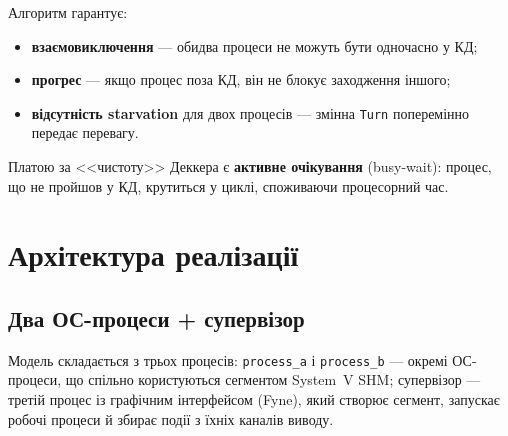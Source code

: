 \documentclass[a4paper,12pt]{article}
\begin{document}
Алгоритм гарантує:
\begin{itemize}
    \item \textbf{взаємовиключення} --- обидва процеси не можуть бути
    одночасно у КД;
    \item \textbf{прогрес} --- якщо процес поза КД, він не блокує
    заходження іншого;
    \item \textbf{відсутність starvation} для двох процесів --- змінна
    \texttt{Turn} поперемінно передає перевагу.
\end{itemize}

Платою за <<чистоту>> Деккера є \textbf{активне очікування} (busy-wait):
процес, що не пройшов у КД, крутиться у циклі, споживаючи процесорний
час.

\section{Архітектура реалізації}

\subsection{Два ОС-процеси + супервізор}

Модель складається з трьох процесів: \texttt{process\_a} і
\texttt{process\_b} --- окремі ОС-процеси, що спільно користуються
сегментом System~V SHM; супервізор --- третій процес із графічним
інтерфейсом (Fyne), який створює сегмент, запускає робочі процеси й
збирає події з їхніх каналів виводу.
\end{document}
